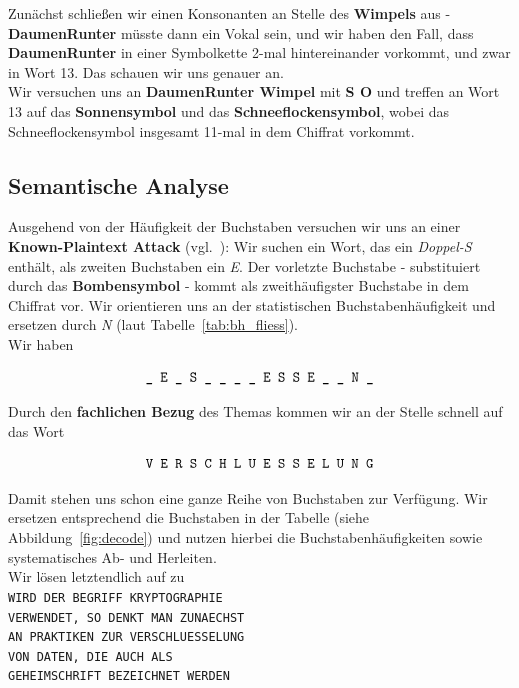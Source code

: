\noindent
Zunächst schließen wir einen Konsonanten an Stelle des \textbf{Wimpels} aus - \textbf{DaumenRunter} müsste dann ein Vokal sein, und wir haben den Fall, dass \textbf{DaumenRunter} in einer Symbolkette 2-mal hintereinander vorkommt, und zwar in Wort 13.
Das schauen wir uns genauer an.\\
Wir versuchen uns an \textbf{DaumenRunter Wimpel} mit \textbf{S O} und treffen an Wort 13 auf das \textbf{Sonnensymbol} und das \textbf{Schneeflockensymbol}, wobei das Schneeflockensymbol insgesamt 11-mal in dem Chiffrat vorkommt.

\subsection*{Semantische Analyse}
Ausgehend von der Häufigkeit der Buchstaben versuchen wir uns an einer \textbf{Known-Plaintext Attack} (vgl.~\cite[50]{ITS3}): Wir suchen ein Wort, das ein \textit{Doppel-S} enthält, als zweiten Buchstaben ein \textit{E}.
Der vorletzte Buchstabe - substituiert durch das \textbf{Bombensymbol} - kommt als zweithäufigster Buchstabe in dem Chiffrat vor.
Wir orientieren uns an der statistischen Buchstabenhäufigkeit und ersetzen durch \textit{N} (laut Tabelle~\ref{tab:bh_fliess}).\\

\noindent
Wir haben

\begin{equation}\notag
\texttt{\_ E \_ S \_ \_ \_ \_ E S S E \_ \_ N \_}
\end{equation}

\noindent
Durch den \textbf{fachlichen Bezug} des Themas kommen wir an der Stelle schnell auf das Wort

\begin{equation}\notag
\texttt{V E R S C H L U E S S E L U N G}
\end{equation}

\noindent
Damit stehen uns schon eine ganze Reihe von Buchstaben zur Verfügung.
Wir ersetzen entsprechend die Buchstaben in der Tabelle (siehe Abbildung~\ref{fig:decode}) und nutzen hierbei die Buchstabenhäufigkeiten sowie systematisches Ab- und Herleiten.\\
Wir lösen letztendlich auf zu\\

\noindent
\texttt{WIRD DER BEGRIFF KRYPTOGRAPHIE}\\
\texttt{VERWENDET, SO DENKT MAN ZUNAECHST}\\
\texttt{AN PRAKTIKEN ZUR VERSCHLUESSELUNG}\\
\texttt{VON DATEN, DIE AUCH ALS}\\
\texttt{GEHEIMSCHRIFT BEZEICHNET WERDEN}\\

